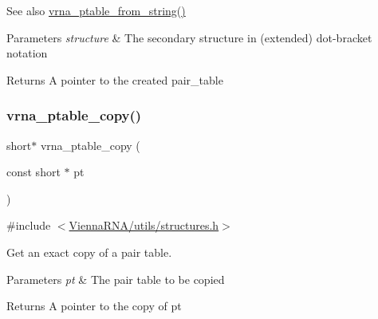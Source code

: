\begin{DoxySeeAlso}{See also}
\mbox{\hyperlink{group__struct__utils__pair__table_gac76c9ef3de507748fb0416a59323362b}{vrna\+\_\+ptable\+\_\+from\+\_\+string()}}
\end{DoxySeeAlso}

\begin{DoxyParams}{Parameters}
{\em structure} & The secondary structure in (extended) dot-\/bracket notation \\
\hline
\end{DoxyParams}
\begin{DoxyReturn}{Returns}
A pointer to the created pair\+\_\+table 
\end{DoxyReturn}
\mbox{\label{group__struct__utils__pair__table_ga2daefbbd6d9f8803731651882f54332d}} 
\subsubsection{\texorpdfstring{vrna\_ptable\_copy()}{vrna\_ptable\_copy()}}
{\footnotesize\ttfamily short$\ast$ vrna\+\_\+ptable\+\_\+copy (\begin{DoxyParamCaption}\item[{const short $\ast$}]{pt }\end{DoxyParamCaption})}



{\ttfamily \#include $<$\mbox{\hyperlink{utils_2structures_8h}{Vienna\+R\+N\+A/utils/structures.\+h}}$>$}



Get an exact copy of a pair table. 


\begin{DoxyParams}{Parameters}
{\em pt} & The pair table to be copied \\
\hline
\end{DoxyParams}
\begin{DoxyReturn}{Returns}
A pointer to the copy of \textquotesingle{}pt\textquotesingle{} 
\end{DoxyReturn}
\mbox{\label{group__struct__utils__pair__table_ga1ee4cdcda1f57d32dcb38032116d335d}} 
